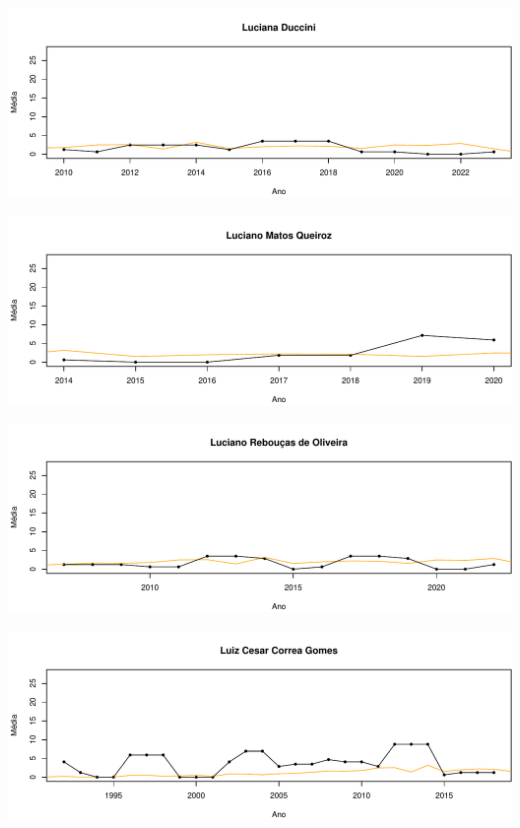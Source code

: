 \documentclass[12pt,brazil]{article}\usepackage[]{graphicx}\usepackage[]{xcolor}
\makeatletter
\def\maxwidth{ %
  \ifdim\Gin@nat@width>\linewidth
    \linewidth
  \else
    \Gin@nat@width
  \fi
}
\makeatother
\begin{document}
\vspace{0.5cm}


{\centering \includegraphics[width=\maxwidth]{figure/mediamovel-26} 

}



\vspace{0.5cm}


{\centering \includegraphics[width=\maxwidth]{figure/mediamovel-27} 

}



\vspace{0.5cm}


{\centering \includegraphics[width=\maxwidth]{figure/mediamovel-28} 

}



\vspace{0.5cm}


{\centering \includegraphics[width=\maxwidth]{figure/mediamovel-29} 

}
\end{document}
